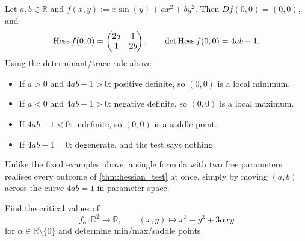 \begin{example}
\label{ex:two_parameter_hessian_family}
Let $a,b \in \mathbb{R}$ and $f(x,y) := x\sin(y) + ax^2 + by^2$. Then $Df(0,0) = (0,0)$, and
\[\operatorname{Hess} f(0,0) = \begin{pmatrix} 2a & 1 \\ 1 & 2b \end{pmatrix}, \qquad \det\operatorname{Hess} f(0,0) = 4ab-1.\]
Using the determinant/trace rule above:
\begin{itemize}
  \item If $a>0$ and $4ab-1>0$: positive definite, so $(0,0)$ is a local minimum.
  \item If $a<0$ and $4ab-1>0$: negative definite, so $(0,0)$ is a local maximum.
  \item If $4ab-1<0$: indefinite, so $(0,0)$ is a saddle point.
  \item If $4ab-1=0$: degenerate, and the test says nothing.
\end{itemize}
Unlike the fixed examples above, a single formula with two free parameters realises every
outcome of \cref{thm:hessian_test} at once, simply by moving $(a,b)$ across the curve $4ab=1$ in
parameter space.
\end{example}

\begin{exercise}
\label{ex:cubic_saddle_family}
Find the critical values of
\[f_\alpha : \mathbb{R}^2 \to \mathbb{R}, \qquad (x,y) \mapsto x^3 - y^3 + 3\alpha xy\]
for $\alpha \in \mathbb{R}\setminus\{0\}$ and determine min/max/saddle points.
\end{exercise}

